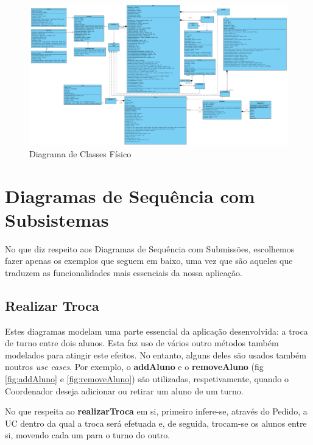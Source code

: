 \documentclass[12pt,a4paper]{report}
\begin{document}
\begin{landscape}
\begin{figure}[H]
	\centering 
	\includegraphics[width=1.6\textwidth]{modelacao/diagramas_de_classe/diagrama_classes.png}  
	\caption{Diagrama de Classes Físico}
\end{figure}
\vfill
\thispagestyle{empty}
\raisebox{0px}{\makebox[\linewidth]{\thepage}}
\end{landscape} 
 
\chapter{Diagramas de Sequência com Subsistemas}
No que diz respeito aos Diagramas de Sequência com Submissões, escolhemos fazer apenas os exemplos que seguem em baixo, uma vez que são aqueles que traduzem as funcionalidades mais essenciais da nossa aplicação.

\section{Realizar Troca}
Estes diagramas modelam uma parte essencial da aplicação desenvolvida: a troca de turno entre dois alunos. Esta faz uso de vários outro métodos também modelados para atingir este efeitos. No entanto, alguns deles são usados também noutros \textit{use cases}. Por exemplo, o \textbf{addAluno} e o \textbf{removeAluno} (fig \ref{fig:addAluno} e \ref{fig:removeAluno}) são utilizadas, respetivamente, quando o Coordenador deseja adicionar ou retirar um aluno de um turno.

No que respeita ao \textbf{realizarTroca} em si, primeiro infere-se, através do Pedido, a UC dentro da qual a troca será efetuada e, de seguida, trocam-se os alunos entre si, movendo cada um para o turno do outro.
\end{document}
